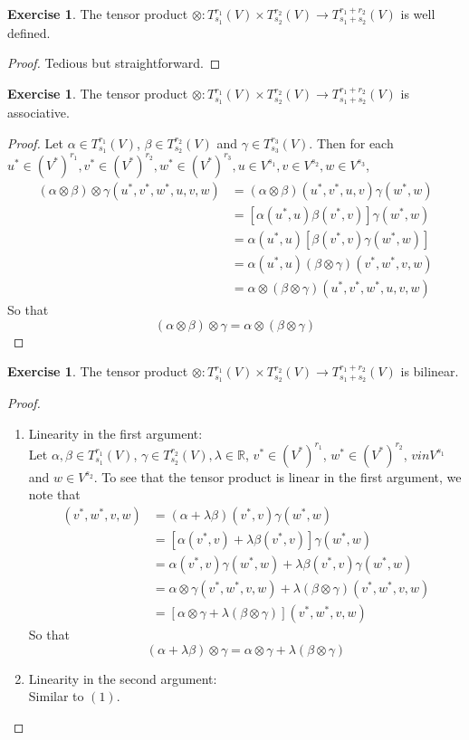 \documentclass[12pt]{amsart}
\theoremstyle{definition}
\newtheorem{ex}[definition]{Exercise}
\newcommand{\al}{\alpha}
\newcommand{\gam}{\gamma}
\newcommand{\bet}{\beta}
\newcommand{\lam}{\lambda}
\newcommand{\R}{\mathbb{R}}
\newcommand{\Tn}[1]{T^{r_{#1}}_{s_{#1}}(V)}
\newcommand{\Tnp}{T^{r_1 + r_2}_{s_1 + s_2}(V)}
\begin{document}
	\begin{ex}
	The tensor product $\otimes : \Tn{1} \times  \Tn{2} \rightarrow \Tnp$ is well defined. 
	\end{ex}
	
	\begin{proof}
	Tedious but straightforward.
\end{proof}	
	
	\begin{ex}
	The tensor product $\otimes : \Tn{1} \times  \Tn{2} \rightarrow \Tnp$ is associative. 
	\end{ex}
	
	\begin{proof}
	Let $\al \in \Tn{1}$, $\bet \in \Tn{2}$ and $\gam \in \Tn{3}$. Then for each $u^* \in (V^*)^{r_1}, v^* \in (V^*)^{r_2}, w^* \in (V^*)^{r_3}, u \in V^{s_1}, v \in V^{s_2}, w \in V^{s_3}$,  
	\begin{align*}
	(\al \otimes \bet) \otimes \gam (u^*, v^*, w^*, u, v, w) 
	&= (\al \otimes \bet) (u^*, v^*, u, v) \gam (w^*, w) \\
	&= [\al(u^*, u) \bet(v^*, v)] \gam(w^*, w) \\
	&= \al(u^*, u) [\bet(v^*, v) \gam(w^*, w)] \\
	&= \al(u^*, u) (\bet \otimes \gam) (v^*, w^*, v, w) \\
	&= \al \otimes (\bet \otimes \gam)(u^*, v^*, w^*, u, v, w) 
	\end{align*}
	So that $$(\al \otimes \bet) \otimes \gam = \al \otimes (\bet \otimes \gam)$$
\end{proof}		
	
	\begin{ex}
	The tensor product $\otimes : \Tn{1} \times  \Tn{2} \rightarrow \Tnp$ is bilinear. 
	\end{ex}
	
	\begin{proof}\
	\begin{enumerate}
	\item Linearity in the first argument:\\
	Let $\al, \bet \in \Tn{1}$, $ \gam \in \Tn{2}, \lam \in \R$, $v^* \in (V^*)^{r_1}$, $w^* \in (V^*)^{r_2}$, $v in V^{s_1}$ and $w \in V^{s_2}$. To see that the tensor product is linear in the first argument, we note that  
	\begin{align*}
	[(\al + \lam \bet) \otimes \gam] (v^*, w^*, v, w) 
	&= (\al + \lam \bet)(v^*, v) \gam(w^*, w) \\
	&= [\al(v^*, v) + \lam \bet (v^*, v)] \gam (w^*, w) \\
	&= \al(v^*, v) \gam (w^*, w) + \lam \bet (v^*, v) \gam (w^*, w) \\
	&= \al \otimes \gam (v^*, w^*, v, w)  + \lam (\bet \otimes \gam) (v^*, w^*, v, w) \\
	&= [\al \otimes \gam + \lam (\bet \otimes \gam)] (v^*, w^*, v, w) 
	\end{align*}
	So that $$(\al + \lam \bet) \otimes \gam = \al \otimes \gam + \lam (\bet \otimes \gam)$$
	\item Linearity in the second argument:\\
	Similar to $(1)$.
	\end{enumerate}
\end{proof}			
	
\end{document}
